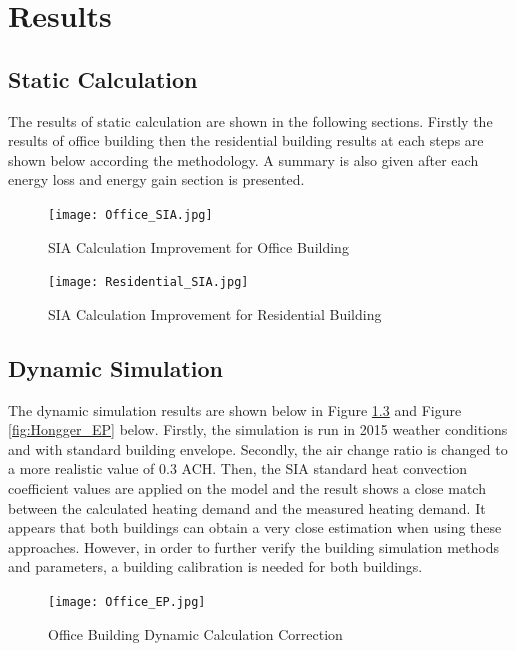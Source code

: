 \chapter{Results}

	\section{Static Calculation}
		The results of static calculation are shown in the following sections. Firstly the results of office building then the residential building results at each steps are shown below according the methodology. A summary is also given after each energy loss and energy gain section is presented.

		\begin{figure}[htbp]
		\centering
		\texttt{[image: Office\_SIA.jpg]}
		\caption{SIA Calculation Improvement for Office Building}
		\label{fig:Sumatra_SIA}
		\end{figure}
		
		\begin{figure}[htbp]
		\centering
		\texttt{[image: Residential\_SIA.jpg]}
		\caption{SIA Calculation Improvement for Residential Building}
		\label{fig:Hongger_SIA}
		\end{figure}
		
		
	\newpage		  
	\section{Dynamic Simulation}		
			The dynamic simulation results are shown below in Figure \ref{fig:Sumatra_EP} and Figure \ref{fig:Hongger_EP} below. Firstly, the simulation is run in 2015 weather conditions and with standard building envelope. Secondly, the air change ratio is changed to a more realistic value of 0.3 ACH. Then, the SIA standard heat convection coefficient values are applied on the model and the result shows a close match between the calculated heating demand and the measured heating demand. It appears that both buildings can obtain a very close estimation when using these approaches. However, in order to further verify the building simulation methods and parameters, a building calibration is needed for both buildings.
		

		\begin{figure}[htbp]
		\centering
		\texttt{[image: Office\_EP.jpg]}
		\caption{Office Building Dynamic Calculation Correction}
		\label{fig:Sumatra_EP}
		\end{figure}

